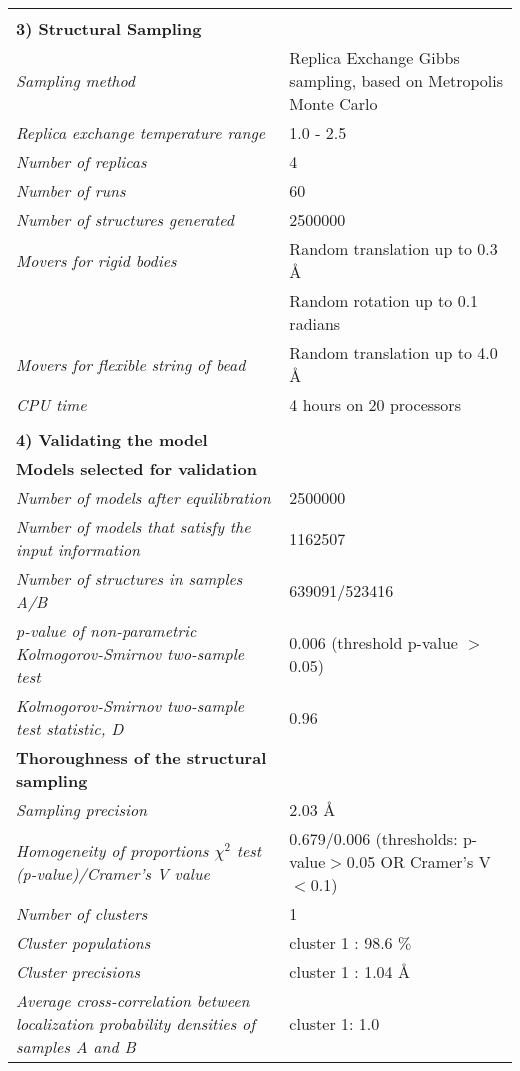 \documentclass[8pt,a4paper]{article}
\begin{document}
\begin{longtable}{ p{} | p{} }
   &  \\
    \normalsize{\textbf{3) Structural Sampling}} & \\
    \hline
            \textit{Sampling method} & Replica Exchange Gibbs sampling, based on Metropolis Monte Carlo\\
                \textit{Replica exchange temperature range} & 1.0 - 2.5\\
                \textit{Number of replicas} & 4\\
                \textit{Number of runs} & 60\\
                \textit{Number of structures generated} & 2500000\\
                \textit{Movers for rigid bodies} & Random translation up to 0.3 \AA\\
            & Random rotation up to 0.1
 radians \\
                \textit{Movers for flexible string of bead} & Random translation up to 4.0 \AA\\
                \textit{CPU time} & 4 hours on 20 processors\\
        
   &  \\
  \normalsize{\textbf{4) Validating the model}} & \\
    \hline
   \textbf{Models selected for validation} & \\
    \hline
          \textit{Number of models after equilibration} & 2500000\\
                \textit{Number of models that satisfy the input information} & 1162507\\
                \textit{Number of structures in samples A/B} & 639091/523416\\
                \textit{p-value of non-parametric Kolmogorov-Smirnov two-sample test} & 0.006 (threshold p-value $>$ 0.05)\\
                \textit{Kolmogorov-Smirnov two-sample test statistic, D} & 0.96\\
           \hline
    
    \textbf{Thoroughness of the structural sampling} & \\
    \hline
          \textit{Sampling precision} & 2.03 \AA \\
                \textit{Homogeneity of proportions $\chi^2$ test (p-value)/Cramer’s V value} & 0.679/0.006 (thresholds: p-value$>$0.05 OR Cramer's V$<$0.1)\\
                \textit{Number of clusters} & 1\\
                \textit{Cluster populations} & cluster 1 : 98.6 $\%$\\
                \textit{Cluster precisions} & cluster 1 : 1.04 \AA\\
                \textit{Average cross-correlation between localization probability densities of samples A and B} & cluster 1: 1.0\\
           \hline
  

\end{longtable}
\end{document}
